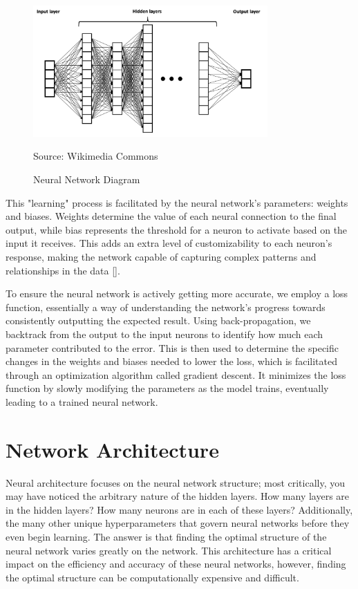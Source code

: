 \begin{figure}[H]
    \centering
    \includegraphics[width=0.8\textwidth]{Figures/neural_network.png}
    \caption{Neural Network Diagram}
    \label{fig:my_second_figure}
    Source: Wikimedia Commons
\end{figure}

This "learning" process is facilitated by the neural network's parameters: weights and biases. Weights determine the value of each neural connection to the final output, while bias represents the threshold for a neuron to activate based on the input it receives. This adds an extra level of customizability to each neuron's response, making the network capable of capturing complex patterns and relationships in the data [\cite{example4}].

To ensure the neural network is actively getting more accurate, we employ a loss function, essentially a way of understanding the network's progress towards consistently outputting the expected result. Using back-propagation, we backtrack from the output to the input neurons to identify how much each parameter contributed to the error. This is then used to determine the specific changes in the weights and biases needed to lower the loss, which is facilitated through an optimization algorithm called gradient descent. It minimizes the loss function by slowly modifying the parameters as the model trains, eventually leading to a trained neural network. 

\vspace{10pt}
\section{Network Architecture}
Neural architecture focuses on the neural network structure; most critically, you may have noticed the arbitrary nature of the hidden layers. How many layers are in the hidden layers? How many neurons are in each of these layers? Additionally, the many other unique hyperparameters that govern neural networks before they even begin learning. The answer is that finding the optimal structure of the neural network varies greatly on the network. This architecture has a critical impact on the efficiency and accuracy of these neural networks, however, finding the optimal structure can be computationally expensive and difficult. 

